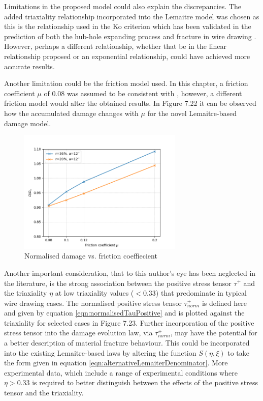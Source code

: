 \documentclass[sn-mathphys,Numbered,draft]{sn-jnl}%
\begin{document}
Limitations in the proposed model could also explain the discrepancies. The added triaxiality relationship incorporated into the Lemaitre model was chosen as this is the relationship used in the Ko criterion \cite{ko_prediction_2007} which has been validated in the prediction of both the hub-hole expanding process \cite{ko_prediction_2007} and fracture in wire drawing \cite{roh_process_2021}. However, perhaps a different relationship, whether that be in the linear relationship proposed or an exponential relationship, could have achieved more accurate results. 

Another limitation could be the friction model used. In this chapter, a friction coefficient $\mu$ of $0.08$ was assumed to be consistent with \citet{roh_process_2021}, however, a different friction model would alter the obtained results. In Figure 7.22 it can be observed how the accumulated damage changes with $\mu$ for the novel Lemaitre-based damage model.

\begin{figure}[htb]
\begin{center}
	\includegraphics[width=0.7\textwidth]{./Figures/SimulationAndAnalysis/compareExperimentalSimulation/frictionDamage.png}
\caption{Normalised damage vs. friction coeffiecient}
\label{fig:notchedRoundBAr}
\end{center}
\end{figure}

Another important consideration, that to this author's eye has been neglected in the literature, is the strong association between the positive stress tensor $\tau^+$ and the triaxiality $\eta$ at low triaxiality values ($<0.33$) that predominate in typical wire drawing cases. The normalised positive stress tensor $\tau^+_{norm}$ is defined here and given by equation \ref{eqn:normalisedTauPositive} and is plotted against the triaxiality for selected cases in Figure 7.23. Further incorporation of the positive stress tensor into the damage evolution law, via $\tau^+_{norm}$, may have the potential for a better description of material fracture behaviour. This could be incorporated into the existing Lemaitre-based laws by altering the function $S(\eta,\xi)$ to take the form given in equation \ref{eqn:alternativeLemaiterDenominator}. More experimental data, which include a range of experimental conditions where $\eta>0.33$ is required to better distinguish between the effects of the positive stress tensor and the triaxiality.
\end{document}
